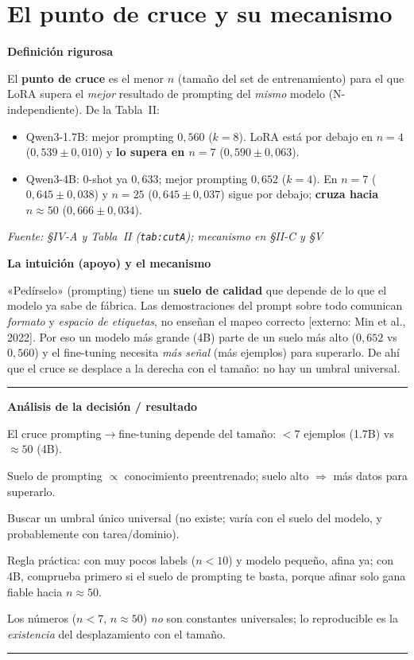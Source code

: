 \documentclass[11pt,a4paper]{article}
\newcommand{\nivel}[1]{\medskip\noindent\textbf{\textcolor{blue!45!black}{#1}}\par\nopagebreak\smallskip}
\newcommand{\fuente}[1]{\nopagebreak\par\hfill{\footnotesize\textit{Fuente: #1}}\par}
\newcommand{\externo}[1]{{\footnotesize\textcolor{red!55!black}{[externo: #1]}}}
\newenvironment{analisis}{%
  \medskip\par\noindent\rule{\linewidth}{0.4pt}\par\nopagebreak
  \textbf{Análisis de la decisión / resultado}\par\nopagebreak\smallskip
  \begin{description}[leftmargin=2.6cm,style=nextline,font=\bfseries]
}{%
  \end{description}\noindent\rule{\linewidth}{0.4pt}\par\medskip
}
\begin{document}
\section{El punto de cruce y su mecanismo}\label{sec:crossover}

\nivel{Definición rigurosa}
El \textbf{punto de cruce} es el menor $n$ (tamaño del set de entrenamiento) para el que LoRA supera
el \emph{mejor} resultado de prompting del \emph{mismo} modelo (N-independiente). De la Tabla~II:
\begin{itemize}[nosep]
  \item Qwen3-1.7B: mejor prompting $0{,}560$ ($k{=}8$). LoRA está por debajo en $n{=}4$
        ($0{,}539\pm0{,}010$) y \textbf{lo supera en $n{=}7$} ($0{,}590\pm0{,}063$).
  \item Qwen3-4B: 0-shot ya $0{,}633$; mejor prompting $0{,}652$ ($k{=}4$). En $n{=}7$ ($0{,}645\pm0{,}038$)
        y $n{=}25$ ($0{,}645\pm0{,}037$) sigue por debajo; \textbf{cruza hacia $n\approx50$}
        ($0{,}666\pm0{,}034$).
\end{itemize}
\fuente{\S IV-A y Tabla~II (\texttt{tab:cutA}); mecanismo en \S II-C y \S V}

\nivel{La intuición (apoyo) y el mecanismo}
«Pedírselo» (prompting) tiene un \textbf{suelo de calidad} que depende de lo que el modelo ya sabe
de fábrica. Las demostraciones del prompt sobre todo comunican \emph{formato} y \emph{espacio de
etiquetas}, no enseñan el mapeo correcto \externo{Min et al., 2022}. Por eso un modelo más grande
(4B) parte de un suelo más alto ($0{,}652$ vs $0{,}560$) y el fine-tuning necesita \emph{más señal}
(más ejemplos) para superarlo. De ahí que el cruce se desplace a la derecha con el tamaño: no hay un
umbral universal.

\begin{analisis}
  \item[Qué] El cruce prompting$\to$fine-tuning depende del tamaño: $<7$ ejemplos (1.7B) vs
        $\approx50$ (4B).
  \item[Por qué] Suelo de prompting $\propto$ conocimiento preentrenado; suelo alto $\Rightarrow$
        más datos para superarlo.
  \item[Alternativas descartadas] Buscar un umbral único universal (no existe; varía con el suelo
        del modelo, y probablemente con tarea/dominio).
  \item[Qué significa] Regla práctica: con muy pocos labels ($n<10$) y modelo pequeño, afina ya; con
        4B, comprueba primero si el suelo de prompting te basta, porque afinar solo gana fiable hacia
        $n\approx50$.
  \item[Qué NO significa] Los números ($n{<}7$, $n{\approx}50$) \emph{no} son constantes
        universales; lo reproducible es la \emph{existencia} del desplazamiento con el tamaño.
\end{analisis}
\end{document}
